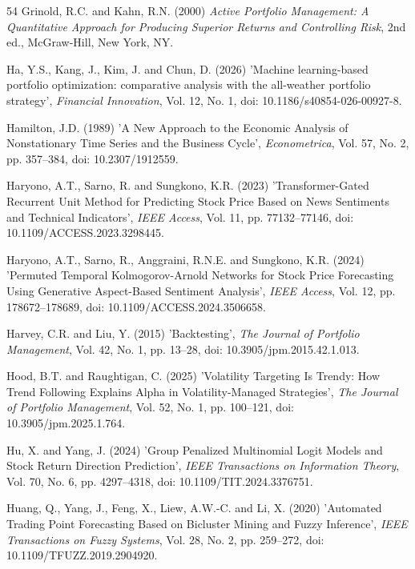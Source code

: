 \begin{thebibliography}{54}
Grinold, R.C. and Kahn, R.N. (2000) {\it Active Portfolio Management: A Quantitative Approach for Producing Superior Returns and Controlling Risk}, 2nd ed., McGraw-Hill, New York, NY.

Ha, Y.S., Kang, J., Kim, J. and Chun, D. (2026) 'Machine learning-based portfolio optimization: comparative analysis with the all-weather portfolio strategy', {\it Financial Innovation}, Vol. 12, No. 1, doi: 10.1186/s40854-026-00927-8.

Hamilton, J.D. (1989) 'A New Approach to the Economic Analysis of Nonstationary Time Series and the Business Cycle', {\it Econometrica}, Vol. 57, No. 2, pp. 357--384, doi: 10.2307/1912559.

Haryono, A.T., Sarno, R. and Sungkono, K.R. (2023) 'Transformer-Gated Recurrent Unit Method for Predicting Stock Price Based on News Sentiments and Technical Indicators', {\it IEEE Access}, Vol. 11, pp. 77132--77146, doi: 10.1109/ACCESS.2023.3298445.

Haryono, A.T., Sarno, R., Anggraini, R.N.E. and Sungkono, K.R. (2024) 'Permuted Temporal Kolmogorov-Arnold Networks for Stock Price Forecasting Using Generative Aspect-Based Sentiment Analysis', {\it IEEE Access}, Vol. 12, pp. 178672--178689, doi: 10.1109/ACCESS.2024.3506658.

Harvey, C.R. and Liu, Y. (2015) 'Backtesting', {\it The Journal of Portfolio Management}, Vol. 42, No. 1, pp. 13--28, doi: 10.3905/jpm.2015.42.1.013.

Hood, B.T. and Raughtigan, C. (2025) 'Volatility Targeting Is Trendy: How Trend Following Explains Alpha in Volatility-Managed Strategies', {\it The Journal of Portfolio Management}, Vol. 52, No. 1, pp. 100--121, doi: 10.3905/jpm.2025.1.764.

Hu, X. and Yang, J. (2024) 'Group Penalized Multinomial Logit Models and Stock Return Direction Prediction', {\it IEEE Transactions on Information Theory}, Vol. 70, No. 6, pp. 4297--4318, doi: 10.1109/TIT.2024.3376751.

Huang, Q., Yang, J., Feng, X., Liew, A.W.-C. and Li, X. (2020) 'Automated Trading Point Forecasting Based on Bicluster Mining and Fuzzy Inference', {\it IEEE Transactions on Fuzzy Systems}, Vol. 28, No. 2, pp. 259--272, doi: 10.1109/TFUZZ.2019.2904920.


\end{thebibliography}
